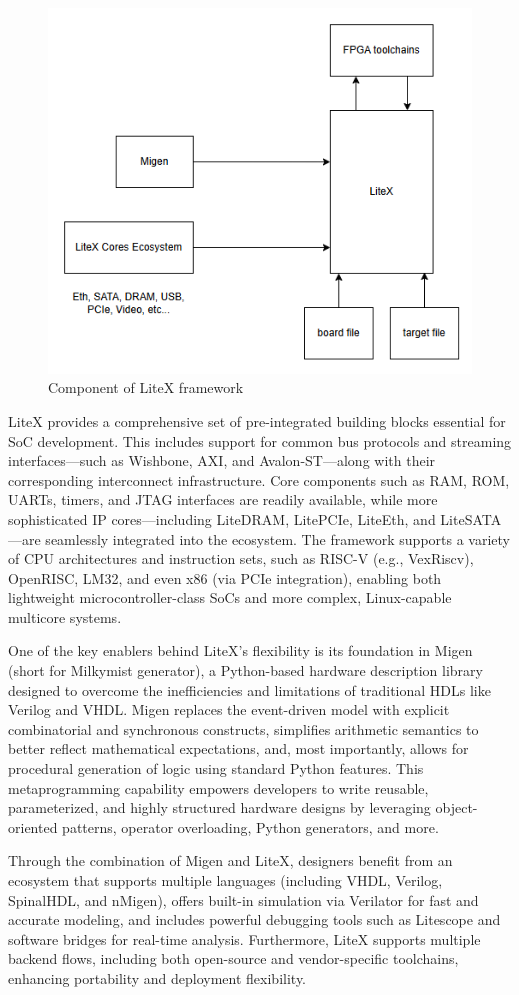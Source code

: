 \begin{figure}[t!]
  \centering
  \includegraphics[width=0.5\linewidth]{Chapitre2/figures/litex.png}
  \caption{Component of LiteX framework}
  \label{litex}
\end{figure}

LiteX \cite{litex} provides a comprehensive set of pre-integrated building blocks essential for SoC development. This includes support for common bus protocols and streaming interfaces—such as Wishbone, AXI, and Avalon-ST—along with their corresponding interconnect infrastructure. Core components such as RAM, ROM, UARTs, timers, and JTAG interfaces are readily available, while more sophisticated IP cores—including LiteDRAM, LitePCIe, LiteEth, and LiteSATA—are seamlessly integrated into the ecosystem. The framework supports a variety of CPU architectures and instruction sets, such as RISC-V (e.g., VexRiscv), OpenRISC, LM32, and even x86 (via PCIe integration), enabling both lightweight microcontroller-class SoCs and more complex, Linux-capable multicore systems.

One of the key enablers behind LiteX's flexibility is its foundation in Migen (short for Milkymist generator), a Python-based hardware description library designed to overcome the inefficiencies and limitations of traditional HDLs like Verilog and VHDL. Migen replaces the event-driven model with explicit combinatorial and synchronous constructs, simplifies arithmetic semantics to better reflect mathematical expectations, and, most importantly, allows for procedural generation of logic using standard Python features. This metaprogramming capability empowers developers to write reusable, parameterized, and highly structured hardware designs by leveraging object-oriented patterns, operator overloading, Python generators, and more.

Through the combination of Migen and LiteX, designers benefit from an ecosystem that supports multiple languages (including VHDL, Verilog, SpinalHDL, and nMigen), offers built-in simulation via Verilator for fast and accurate modeling, and includes powerful debugging tools such as Litescope and software bridges for real-time analysis. Furthermore, LiteX supports multiple backend flows, including both open-source and vendor-specific toolchains, enhancing portability and deployment flexibility.

